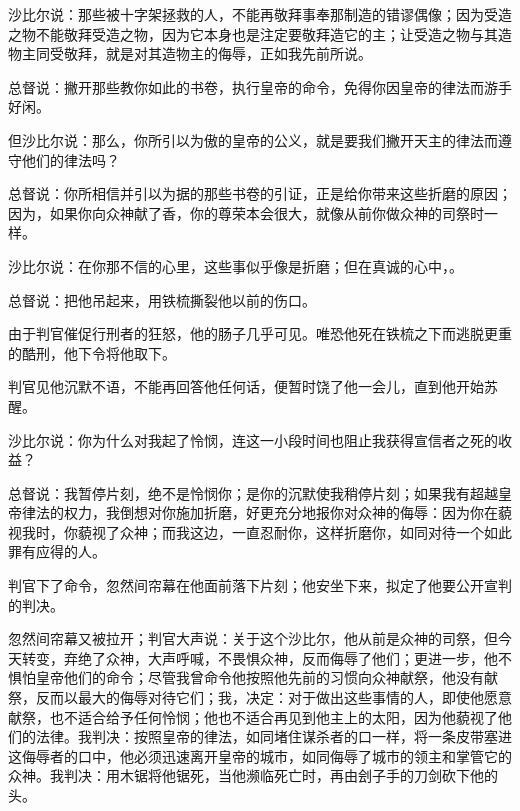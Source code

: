 沙比尔说：那些被十字架拯救的人，不能再敬拜事奉那制造的错谬偶像；因为受造之物不能敬拜受造之物，因为它本身也是注定要敬拜造它的主；让受造之物与其造物主同受敬拜，就是对其造物主的侮辱，正如我先前所说。\par

总督说：撇开那些教你如此的书卷，执行皇帝的命令，免得你因皇帝的律法而游手好闲。\par

但沙比尔说：那么，你所引以为傲的皇帝的公义，就是要我们撇开天主的律法而遵守他们的律法吗？\par

总督说：你所相信并引以为据的那些书卷的引证，正是给你带来这些折磨的原因；因为，如果你向众神献了香，你的尊荣本会很大，就像从前你做众神的司祭时一样。\par

沙比尔说：在你那不信的心里，这些事似乎像是折磨；但在真诚的心中，。\par

总督说：把他吊起来，用铁梳撕裂他以前的伤口。\par

由于判官催促行刑者的狂怒，他的肠子几乎可见。唯恐他死在铁梳之下而逃脱更重的酷刑，他下令将他取下。\par

判官见他沉默不语，不能再回答他任何话，便暂时饶了他一会儿，直到他开始苏醒。\par

沙比尔说：你为什么对我起了怜悯，连这一小段时间也阻止我获得宣信者之死的收益？\par

总督说：我暂停片刻，绝不是怜悯你；是你的沉默使我稍停片刻；如果我有超越皇帝律法的权力，我倒想对你施加折磨，好更充分地报你对众神的侮辱：因为你在藐视我时，你藐视了众神；而我这边，一直忍耐你，这样折磨你，如同对待一个如此罪有应得的人。\par

判官下了命令，忽然间帘幕在他面前落下片刻；他安坐下来，拟定了他要公开宣判的判决。\par

忽然间帘幕又被拉开；判官大声说：关于这个沙比尔，他从前是众神的司祭，但今天转变，弃绝了众神，大声呼喊，不畏惧众神，反而侮辱了他们；更进一步，他不惧怕皇帝他们的命令；尽管我曾命令他按照他先前的习惯向众神献祭，他没有献祭，反而以最大的侮辱对待它们；我，决定：对于做出这些事情的人，即使他愿意献祭，也不适合给予任何怜悯；他也不适合再见到他主上的太阳，因为他藐视了他们的法律。我判决：按照皇帝的律法，如同堵住谋杀者的口一样，将一条皮带塞进这侮辱者的口中，他必须迅速离开皇帝的城市，如同侮辱了城市的领主和掌管它的众神。我判决：用木锯将他锯死，当他濒临死亡时，再由刽子手的刀剑砍下他的头。\par

